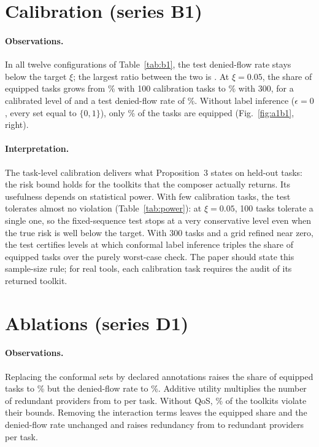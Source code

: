 \documentclass[10pt]{article}
\begin{document}
\section{Calibration (series B1)}
\paragraph{Observations.} In all twelve configurations of Table~\ref{tab:b1}, the test denied-flow rate stays below the target $\xi$; the largest ratio between the two is \RBMaxDfrRatio. At $\xi=0.05$, the share of equipped tasks grows from \RBEqHundred\% with 100 calibration tasks to \RBEqThree\% with 300, for a calibrated level of \RBEpsThree{} and a test denied-flow rate of \RBDfrThree\%. Without label inference ($\epsilon=0$, every set equal to $\{0,1\}$), only \RBEqEpsZero\% of the tasks are equipped (Fig.~\ref{fig:a1b1}, right).
\paragraph{Interpretation.} The task-level calibration delivers what Proposition~3 states on held-out tasks: the risk bound holds for the toolkits that the composer actually returns. Its usefulness depends on statistical power. With few calibration tasks, the test tolerates almost no violation (Table~\ref{tab:power}): at $\xi=0.05$, 100 tasks tolerate a single one, so the fixed-sequence test stops at a very conservative level even when the true risk is well below the target. With 300 tasks and a grid refined near zero, the test certifies levels at which conformal label inference triples the share of equipped tasks over the purely worst-case check. The paper should state this sample-size rule; for real tools, each calibration task requires the audit of its returned toolkit.

\section{Ablations (series D1)}
\paragraph{Observations.} Replacing the conformal sets by declared annotations raises the share of equipped tasks to \RDDeclaredAnnotationsEq\% but the denied-flow rate to \RDDeclaredAnnotationsDfr\%. Additive utility multiplies the number of redundant providers from \RDFullEmerkitRed{} to \RDAdditiveUtilityRed{} per task. Without QoS, \RDNoQosQviol\% of the toolkits violate their bounds. Removing the interaction terms leaves the equipped share and the denied-flow rate unchanged and raises redundancy from \RDFullEmerkitRed{} to \RDNoInteractionsRed{} redundant providers per task.
\end{document}
